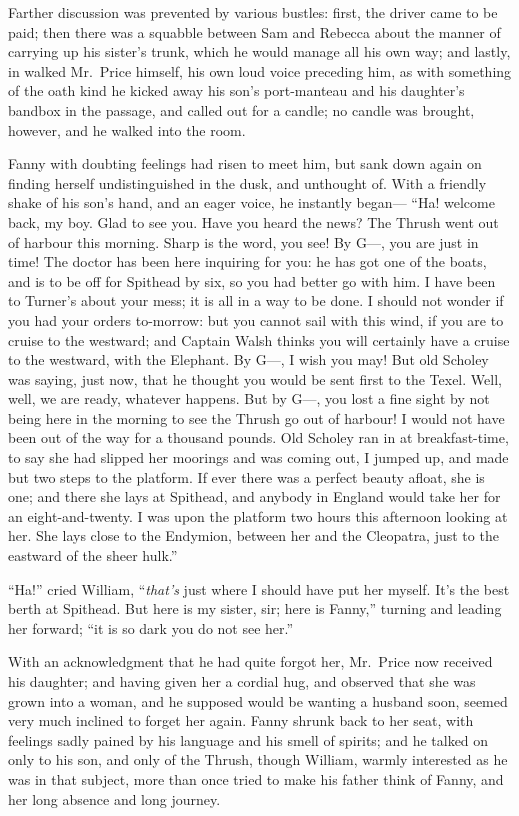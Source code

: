 \documentclass{article}
\begin{document}
Farther discussion was prevented by various bustles:
first, the driver came to be paid; then there was a squabble
between Sam and Rebecca about the manner of carrying up
his sister's trunk, which he would manage all his own way;
and lastly, in walked Mr.\ Price himself, his own loud
voice preceding him, as with something of the oath kind
he kicked away his son's port-manteau and his daughter's
bandbox in the passage, and called out for a candle;
no candle was brought, however, and he walked into the room.

Fanny with doubting feelings had risen to meet him,
but sank down again on finding herself undistinguished
in the dusk, and unthought of.  With a friendly shake
of his son's hand, and an eager voice, he instantly began---%
``Ha! welcome back, my boy.  Glad to see you.  Have you heard
the news?  The Thrush went out of harbour this morning.
Sharp is the word, you see!  By G---, you are just in time!
The doctor has been here inquiring for you:  he has got
one of the boats, and is to be off for Spithead by six,
so you had better go with him.  I have been to Turner's
about your mess; it is all in a way to be done.
I should not wonder if you had your orders to-morrow:
but you cannot sail with this wind, if you are to cruise
to the westward; and Captain Walsh thinks you will certainly
have a cruise to the westward, with the Elephant.
By G---, I wish you may!  But old Scholey was saying,
just now, that he thought you would be sent first to
the Texel.  Well, well, we are ready, whatever happens.
But by G---, you lost a fine sight by not being here
in the morning to see the Thrush go out of harbour!
I would not have been out of the way for a thousand pounds.
Old Scholey ran in at breakfast-time, to say she had
slipped her moorings and was coming out, I jumped up,
and made but two steps to the platform.  If ever there
was a perfect beauty afloat, she is one; and there she lays
at Spithead, and anybody in England would take her for an
eight-and-twenty. I was upon the platform two hours this
afternoon looking at her.  She lays close to the Endymion,
between her and the Cleopatra, just to the eastward of the
sheer hulk.''

``Ha!'' cried William, ``\emph{that's} just where I should have
put her myself.  It's the best berth at Spithead.
But here is my sister, sir; here is Fanny,'' turning and
leading her forward; ``it is so dark you do not see her.''

With an acknowledgment that he had quite forgot her,
Mr.\ Price now received his daughter; and having given
her a cordial hug, and observed that she was grown into
a woman, and he supposed would be wanting a husband soon,
seemed very much inclined to forget her again.
Fanny shrunk back to her seat, with feelings sadly
pained by his language and his smell of spirits;
and he talked on only to his son, and only of the Thrush,
though William, warmly interested as he was in that subject,
more than once tried to make his father think of Fanny,
and her long absence and long journey.
\end{document}
